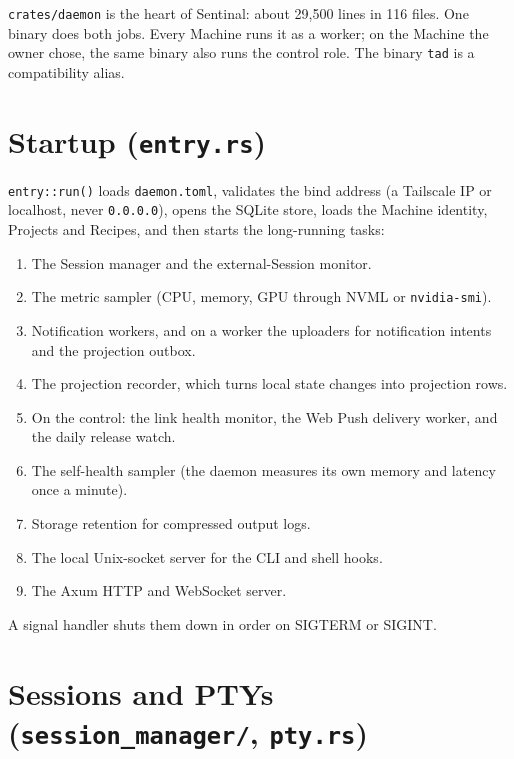 \texttt{crates/\allowbreak{}daemon} is the heart of Sentinal: about 29,500 lines in 116 files. One binary does both jobs. Every Machine runs it as a worker; on the Machine the owner chose, the same binary also runs the control role. The binary \texttt{tad} is a compatibility alias.

\section{\texorpdfstring{Startup (\texttt{entry.\allowbreak{}rs})}{Startup (entry.rs)}}

\texttt{entry:\allowbreak{}:\allowbreak{}run()} loads \texttt{daemon.\allowbreak{}toml}, validates the bind address (a Tailscale IP or localhost, never \texttt{0.\allowbreak{}0.\allowbreak{}0.\allowbreak{}0}), opens the SQLite store, loads the Machine identity, Projects and Recipes, and then starts the long-running tasks:

\begin{enumerate}
\item The Session manager and the external-Session monitor.
\item The metric sampler (CPU, memory, GPU through NVML or \texttt{nvidia-{}\allowbreak{}smi}).
\item Notification workers, and on a worker the uploaders for notification intents and the projection outbox.
\item The projection recorder, which turns local state changes into projection rows.
\item On the control: the link health monitor, the Web Push delivery worker, and the daily release watch.
\item The self-health sampler (the daemon measures its own memory and latency once a minute).
\item Storage retention for compressed output logs.
\item The local Unix-socket server for the CLI and shell hooks.
\item The Axum HTTP and WebSocket server.
\end{enumerate}

A signal handler shuts them down in order on SIGTERM or SIGINT.

\section{\texorpdfstring{Sessions and PTYs (\texttt{session\_\allowbreak{}manager/\allowbreak{}}, \texttt{pty.\allowbreak{}rs})}{Sessions and PTYs (session\_manager/, pty.rs)}}

